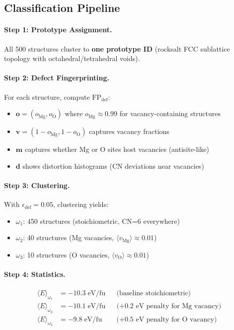 \documentclass[11pt]{article}
\begin{document}
\subsection{Classification Pipeline}

\paragraph{Step 1: Prototype Assignment.}
All 500 structures cluster to \textbf{one prototype ID} (rocksalt FCC sublattice
topology with octahedral/tetrahedral voids).

\paragraph{Step 2: Defect Fingerprinting.}
For each structure, compute $\mathrm{FP}_{\mathrm{def}}$:
\begin{itemize}
  \item $\mathbf{o} = (o_{\mathrm{Mg}}, o_{\mathrm{O}})$ where $o_{\mathrm{Mg}} \approx 0.99$
        for vacancy-containing structures
  \item $\mathbf{v} = (1 - o_{\mathrm{Mg}}, 1 - o_{\mathrm{O}})$ captures vacancy fractions
  \item $\mathbf{m}$ captures whether Mg or O sites host vacancies (antisite-like)
  \item $\mathbf{d}$ shows distortion histograms (CN deviations near vacancies)
\end{itemize}

\paragraph{Step 3: Clustering.}
With $\epsilon_{\mathrm{def}} = 0.05$, clustering yields:
\begin{itemize}
  \item $\omega_1$: 450 structures (stoichiometric, CN=6 everywhere)
  \item $\omega_2$: 40 structures (Mg vacancies, $\langle v_{\mathrm{Mg}} \rangle \approx 0.01$)
  \item $\omega_3$: 10 structures (O vacancies, $\langle v_{\mathrm{O}} \rangle \approx 0.01$)
\end{itemize}

\paragraph{Step 4: Statistics.}
\begin{align}
\langle E \rangle_{\omega_1} &= -10.3 \;\text{eV/fu} && \text{(baseline stoichiometric)} \\
\langle E \rangle_{\omega_2} &= -10.1 \;\text{eV/fu} && \text{(+0.2~eV penalty for Mg vacancy)} \\
\langle E \rangle_{\omega_3} &= -9.8 \;\text{eV/fu} && \text{(+0.5~eV penalty for O vacancy)}
\end{align}
\end{document}
